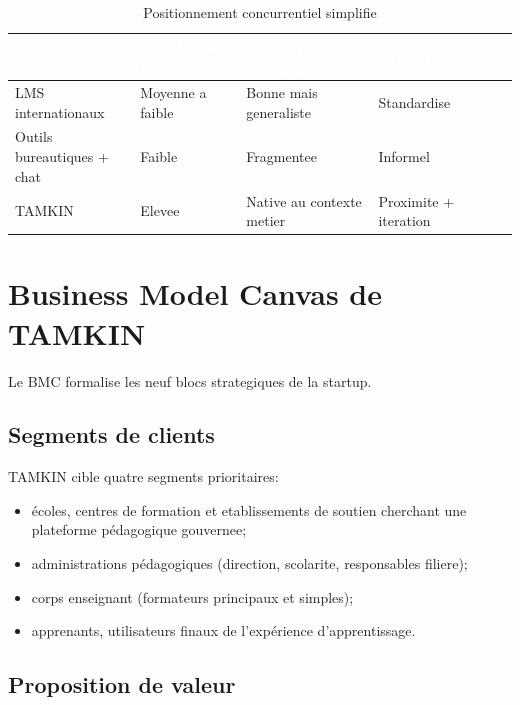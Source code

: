 \documentclass[12pt,a4paper,oneside]{report}
\begin{document}
\renewcommand{\arraystretch}{1.3}
\begin{table}[H]
\centering
\caption{Positionnement concurrentiel simplifie}
\label{tab:positionnement_concurrentiel}
\begin{tabular}{|p{3.0cm}|p{3.2cm}|p{3.2cm}|p{3.2cm}|}
\hline
\rowcolor{ustoblue}
\textcolor{white}{Solution} & \textcolor{white}{Adaptation locale} & \textcolor{white}{Gouvernance pédagogique} & \textcolor{white}{Accompagnement} \\
\hline
LMS internationaux & Moyenne a faible & Bonne mais generaliste & Standardise \\
\hline
Outils bureautiques + chat & Faible & Fragmentee & Informel \\
\hline
TAMKIN & Elevee & Native au contexte metier & Proximite + iteration \\
\hline
\end{tabular}
\end{table}

\section{Business Model Canvas de TAMKIN}

Le BMC formalise les neuf blocs strategiques de la startup\cite{osterwalder2010bmc}.

\subsection{Segments de clients}

TAMKIN cible quatre segments prioritaires:
\begin{itemize}
  \item écoles, centres de formation et etablissements de soutien cherchant une plateforme pédagogique gouvernee;
  \item administrations pédagogiques (direction, scolarite, responsables filiere);
  \item corps enseignant (formateurs principaux et simples);
  \item apprenants, utilisateurs finaux de l'expérience d'apprentissage.
\end{itemize}

\subsection{Proposition de valeur}
\end{document}
